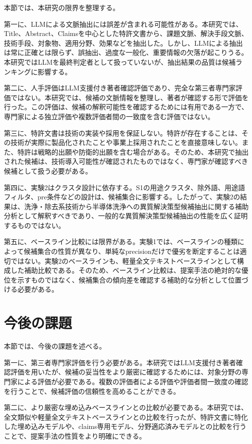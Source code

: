 本節では、本研究の限界を整理する。

第一に、LLMによる文脈抽出には誤差が含まれる可能性がある。本研究では、Title、Abstract、Claimsを中心とした特許文書から、課題文脈、解決手段文脈、技術手段、対象物、適用分野、効果などを抽出した。しかし、LLMによる抽出は常に正確とは限らず、誤抽出、過度な一般化、重要情報の欠落が起こりうる。本研究ではLLMを最終判定者として扱っていないが、抽出結果の品質は候補ランキングに影響する。

第二に、人手評価はLLM支援付き著者確認評価であり、完全な第三者専門家評価ではない。本研究では、候補の文脈情報を整理し、著者が確認する形で評価を行った。この評価は、候補の解釈可能性を確認するためには有用である一方で、専門家による独立評価や複数評価者間の一致度を含む評価ではない。

第三に、特許文書は技術の実装や採用を保証しない。特許が存在することは、その技術が実際に製品化されたことや事業上採用されたことを直接意味しない。また、特許は戦略的出願や防衛的出願を含む場合がある。そのため、本研究で抽出された候補は、技術導入可能性が確認されたものではなく、専門家が確認すべき候補として扱う必要がある。

第四に、実験2はクラスタ設計に依存する。S1の用途クラスタ、除外語、用途語フィルタ、pre条件などの設計は、候補集合に影響する。したがって、実験2の結果は、洗浄・除去系技術から半導体洗浄への異質解決策型候補抽出に関する補助分析として解釈すべきであり、一般的な異質解決策型候補抽出の性能を広く証明するものではない。

第五に、ベースライン比較には限界がある。実験1では、ベースラインの種類によって候補集合の性質が異なり、単純なprecisionだけで優劣を断定することは適切ではない。実験2のベースラインも、軽量全文テキストベースラインとして構成した補助比較である。そのため、ベースライン比較は、提案手法の絶対的な優位を示すものではなく、候補集合の傾向差を確認する補助的な分析として位置づける必要がある。

\section{今後の課題}

本節では、今後の課題を述べる。

第一に、第三者専門家評価を行う必要がある。本研究ではLLM支援付き著者確認評価を用いたが、候補の妥当性をより厳密に確認するためには、対象分野の専門家による評価が必要である。複数の評価者による評価や評価者間一致度の確認を行うことで、候補評価の信頼性を高めることができる。

第二に、より厳密な埋め込みベースラインとの比較が必要である。本研究では、全文類似や軽量全文テキストベースラインとの比較を行ったが、特許文書に特化した埋め込みモデルや、claims専用モデル、分野適応済みモデルとの比較を行うことで、提案手法の性質をより明確にできる。

